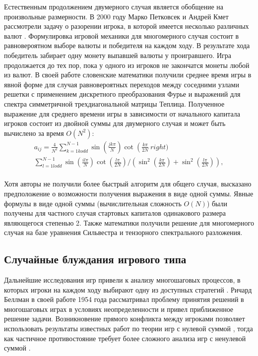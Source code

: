 Естественным продолжением двумерного случая является обобщение на произвольные размерности. В 2000 году Марко Петковсек и Андрей Кмет рассмотрели задачу о разорении игрока, в которой имеется несколько различных валют \cite{kmet_gamblers_2002}. Формулировка игровой механики для многомерного случая состоит в равновероятном выборе валюты и победителя на каждом ходу. В результате хода победитель забирает одну монету выпавшей валюты у проигравшего. Игра продолжается до тех пор, пока у одного из игроков не закончатся монеты любой из валют. В своей работе словенские математики получили среднее время игры в явной форме для случая равновероятных переходов между соседними узлами решетки с применением дискретного преобразования Фурье и выражений для спектра симметричной трехдиагональной матрицы Теплица. Полученное выражение для среднего времени игры в зависимости от начального капитала игроков состоит из двойной суммы для двумерного случая и может быть вычислено за время $O(N^2)$: 
\begin{equation}
    \begin{aligned}
    a_{ij} = \frac{4}{N^2} \sum_{k=1 k odd}^{N - 1} \sin \left (\frac{jk\pi}{N} \right )\cot \left (\frac{k\pi}{2N}\ right) \\
    \sum_{l=1 l odd}^{N - 1} \sin \left (\frac{il\pi}{N} \right )\cot \left (\frac{l\pi}{2N} \right )/\left  (\sin^2 \left (\frac{k\pi}{2N} \right )+\sin^2 \left (\frac{l\pi}{2N} \right ) \right ), \\
    \end{aligned}
    \label{eq:eq7}
\end{equation}

Хотя авторы не получили более быстрый алгоритм для общего случая, высказано предположение о возможности получения выражения в виде одной суммы. Явные формулы в виде одной суммы (вычислительная сложность $O(N)$) были получены для частного случая стартовых капиталов одинакового размера являющегося степенью 2. Также математики получили решение для многомерного случая на базе уравнения Сильвестра и тензорного спектрального разложения.

\subsection{Случайные блуждания игрового типа}\label{subsec:ch1/sec3/sub2}

Дальнейшие исследования игр привели к анализу многошаговых процессов, в которых игроки на каждом ходу выбирают одну из доступных стратегий \cite{bellman_decision_1954}. Ричард Беллман в своей работе 1954 года рассматривал проблему принятия решений в многошаговых играх в условиях неопределенности \cite{bellman_decision-making_1954} и привел приближенное решение задачи. Возникновение прямого конфликта между игроками позволяет использовать результаты известных работ по теории игр с нулевой суммой \cite{nash_non-cooperative_1951}, тогда как частичное противостояние требует более сложного анализа игр с ненулевой суммой \cite{bellman_non-zero_1949}. 

